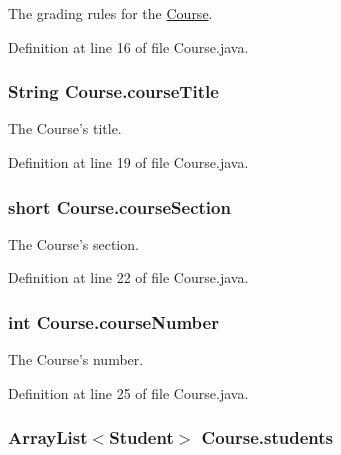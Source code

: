 The grading rules for the \hyperlink{classCourse}{Course}. 



Definition at line 16 of file Course.java.\hypertarget{classCourse_b5d0d78500c3a2ac7e3119e492e84c43}{
\subsubsection{\setlength{\rightskip}{0pt plus 5cm}String {\bf Course.courseTitle}}}
\label{classCourse_b5d0d78500c3a2ac7e3119e492e84c43}


The Course's title. 



Definition at line 19 of file Course.java.\hypertarget{classCourse_3c691a1d87018604cc97964dd1d23969}{
\subsubsection{\setlength{\rightskip}{0pt plus 5cm}short {\bf Course.courseSection}}}
\label{classCourse_3c691a1d87018604cc97964dd1d23969}


The Course's section. 



Definition at line 22 of file Course.java.\hypertarget{classCourse_d80c00a2eb9c442c923701341091c041}{
\subsubsection{\setlength{\rightskip}{0pt plus 5cm}int {\bf Course.courseNumber}}}
\label{classCourse_d80c00a2eb9c442c923701341091c041}


The Course's number. 



Definition at line 25 of file Course.java.\hypertarget{classCourse_4c9b5c99514f93acca32bfc5b59056a0}{
\subsubsection{\setlength{\rightskip}{0pt plus 5cm}ArrayList$<${\bf Student}$>$ {\bf Course.students}}}
\label{classCourse_4c9b5c99514f93acca32bfc5b59056a0}


